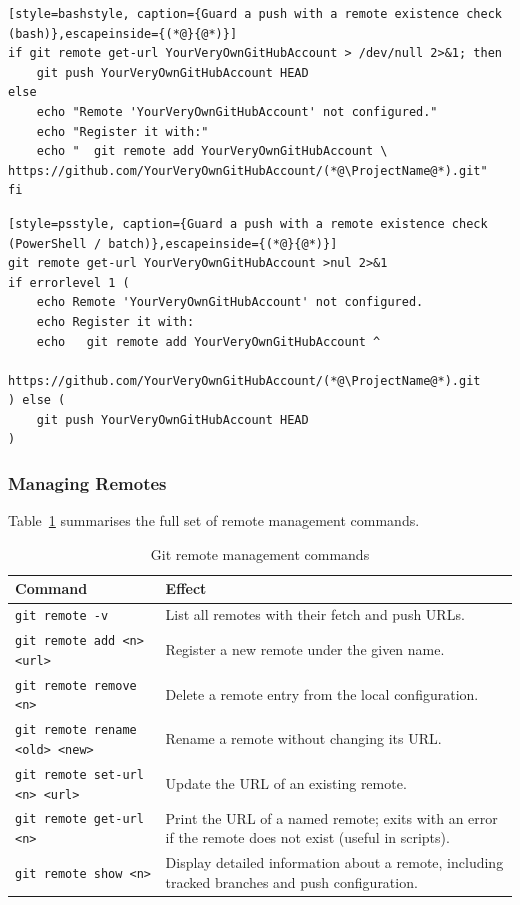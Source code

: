 \begin{lstlisting}[style=bashstyle, caption={Guard a push with a remote existence check (bash)},escapeinside={(*@}{@*)}]
if git remote get-url YourVeryOwnGitHubAccount > /dev/null 2>&1; then
    git push YourVeryOwnGitHubAccount HEAD
else
    echo "Remote 'YourVeryOwnGitHubAccount' not configured."
    echo "Register it with:"
    echo "  git remote add YourVeryOwnGitHubAccount \
https://github.com/YourVeryOwnGitHubAccount/(*@\ProjectName@*).git"
fi
\end{lstlisting}

\begin{lstlisting}[style=psstyle, caption={Guard a push with a remote existence check (PowerShell / batch)},escapeinside={(*@}{@*)}]
git remote get-url YourVeryOwnGitHubAccount >nul 2>&1
if errorlevel 1 (
    echo Remote 'YourVeryOwnGitHubAccount' not configured.
    echo Register it with:
    echo   git remote add YourVeryOwnGitHubAccount ^
        https://github.com/YourVeryOwnGitHubAccount/(*@\ProjectName@*).git
) else (
    git push YourVeryOwnGitHubAccount HEAD
)
\end{lstlisting}

\subsubsection{Managing Remotes}

Table~\ref{tab:git-remote-commands} summarises the full set of remote
management commands.

\begin{table}[h]
\centering
\caption{Git remote management commands}
\label{tab:git-remote-commands}
\begin{tabular}{lp{8.5cm}}
\toprule
Command & Effect \\
\midrule
\texttt{git remote -v} &
  List all remotes with their fetch and push URLs. \\
\texttt{git remote add <n> <url>} &
  Register a new remote under the given name. \\
\texttt{git remote remove <n>} &
  Delete a remote entry from the local configuration. \\
\texttt{git remote rename <old> <new>} &
  Rename a remote without changing its URL. \\
\texttt{git remote set-url <n> <url>} &
  Update the URL of an existing remote. \\
\texttt{git remote get-url <n>} &
  Print the URL of a named remote; exits with an error if
  the remote does not exist (useful in scripts). \\
\texttt{git remote show <n>} &
  Display detailed information about a remote, including
  tracked branches and push configuration. \\
\bottomrule
\end{tabular}
\end{table}

